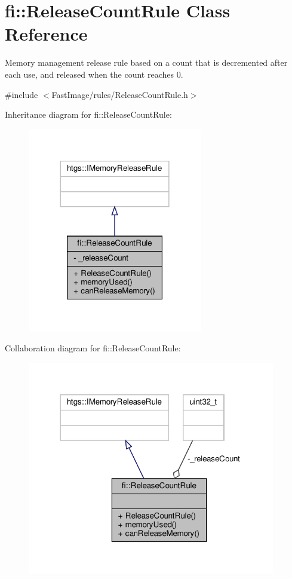 \hypertarget{classfi_1_1ReleaseCountRule}{}\section{fi\+:\+:Release\+Count\+Rule Class Reference}
\label{classfi_1_1ReleaseCountRule}


Memory management release rule based on a count that is decremented after each use, and released when the count reaches 0.  




{\ttfamily \#include $<$Fast\+Image/rules/\+Release\+Count\+Rule.\+h$>$}



Inheritance diagram for fi\+:\+:Release\+Count\+Rule\+:
\nopagebreak
\begin{figure}[H]
\begin{center}
\leavevmode
\includegraphics[width=216pt]{d5/de8/classfi_1_1ReleaseCountRule__inherit__graph}
\end{center}
\end{figure}


Collaboration diagram for fi\+:\+:Release\+Count\+Rule\+:
\nopagebreak
\begin{figure}[H]
\begin{center}
\leavevmode
\includegraphics[width=307pt]{d2/d3e/classfi_1_1ReleaseCountRule__coll__graph}
\end{center}
\end{figure}

